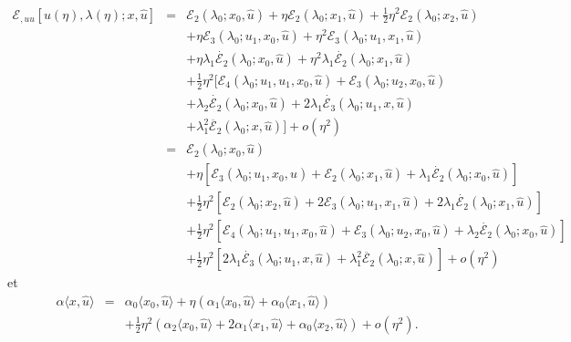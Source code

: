 \documentclass{article}
\newcommand{\nobracket}{}
\newcommand{\nocomma}{}
\begin{document}
\begin{eqnarray*}
  \mathcal{E}_{, u \nocomma u} [u (\eta), \lambda (\eta) ; x, \hat{u}] & = &
  \mathcal{E}_2 (\lambda_0 ; x_0, \hat{u}) + \eta \mathcal{E}_2 (\lambda_0 ;
  x_1, \hat{u}) + \tfrac{1}{2} \eta^2 \mathcal{E}_2 (\lambda_0 ; x_2,
  \hat{u})\\
  &  & + \eta \mathcal{E}_3 (\lambda_0 ; u_1, x_0, \hat{u}) + \eta^2
  \mathcal{E}_3 (\lambda_0 ; u_1, x_1, \hat{u})\\
  &  & + \eta \lambda_1  \dot{\mathcal{E}_2} (\lambda_0 ; x_0, \hat{u}) +
  \eta^2 \lambda_1  \dot{\mathcal{E}_2} (\lambda_0 ; x_1, \hat{u})\\
  &  & + \tfrac{1}{2} \eta^2  [\mathcal{E}_4 (\lambda_0 ; u_1, u_1, x_0,
  \hat{u}) \nobracket +\mathcal{E}_3 (\lambda_0 ; u_2, x_0, \hat{u})\\
  &  & + \lambda_2  \dot{\mathcal{E}_2} (\lambda_0 ; x_0, \hat{u}) + 2
  \lambda_1  \dot{\mathcal{E}_3} (\lambda_0 ; u_1, x, \hat{u})\\
  &  & + \lambda_1^2  \ddot{\mathcal{E}_2} (\lambda_0 ; x, \hat{u})
  \nobracket] + o (\eta^2)\\
  & = & \mathcal{E}_2 (\lambda_0 ; x_0, \hat{u})\\
  &  & + \eta [\mathcal{E}_3 (\lambda_0 ; u_1, x_0, \hat{u}) +\mathcal{E}_2
  (\lambda_0 ; x_1, \hat{u}) + \lambda_1  \dot{\mathcal{E}_2} (\lambda_0 ;
  x_0, \hat{u})]\\
  &  & + \tfrac{1}{2} \eta^2  [\mathcal{E}_2 (\lambda_0 ; x_2, \hat{u}) +
  2\mathcal{E}_3 (\lambda_0 ; u_1, x_1, \hat{u}) + 2 \lambda_1
  \dot{\mathcal{E}_2} (\lambda_0 ; x_1, \hat{u})]\\
  &  & + \tfrac{1}{2} \eta^2  [\mathcal{E}_4 (\lambda_0 ; u_1, u_1, x_0,
  \hat{u}) +\mathcal{E}_3 (\lambda_0 ; u_2, x_0, \hat{u}) + \lambda_2
  \dot{\mathcal{E}_2} (\lambda_0 ; x_0, \hat{u})]\\
  &  & + \tfrac{1}{2} \eta^2  [2 \lambda_1  \dot{\mathcal{E}_3} (\lambda_0 ;
  u_1, x, \hat{u}) + \lambda_1^2  \ddot{\mathcal{E}_2} (\lambda_0 ; x,
  \hat{u})] + o (\eta^2)
\end{eqnarray*}
et
\begin{eqnarray*}
  \alpha \langle x, \hat{u} \rangle & = & \alpha_0  \langle x_0, \hat{u}
  \rangle + \eta (\alpha_1 \langle x_0, \hat{u} \rangle + \alpha_0 \langle
  x_1, \hat{u} \rangle)\\
  &  & + \tfrac{1}{2} \eta^2  (\alpha_2 \langle x_0, \hat{u} \rangle + 2
  \alpha_1 \langle x_1, \hat{u} \rangle + \alpha_0 \langle x_2, \hat{u}
  \rangle) + o (\eta^2) .
\end{eqnarray*}
\end{document}
